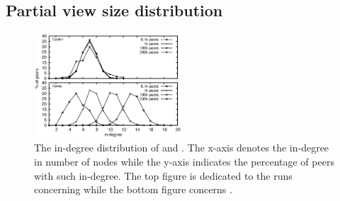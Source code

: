 \subsection{Partial view size distribution}
\label{subsec:dist}

\begin{figure}
  \centering
  \includegraphics[width=0.49\textwidth]{img/histo.eps}
  \caption{\label{fig:histo}The in-degree distribution of \CYCLON and
    \SPRAY. The x-axis denotes the in-degree in number of nodes while the
    y-axis indicates the percentage of peers with such in-degree. The top
    figure is dedicated to the runs concerning \CYCLON while the bottom figure
    concerns \SPRAY.}
\end{figure}

